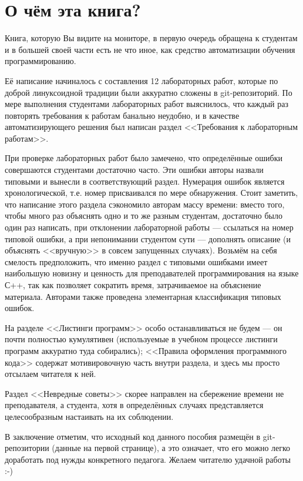 \chapter*{О чём эта книга?}

Книга, которую Вы видите на мониторе,
в первую очередь обращена к студентам и
в большей своей части есть не что иное, как средство автоматизации обучения программированию.

Её написание начиналось с составления 12 лабораторных работ,
которые по доброй линуксоидной традиции были аккуратно сложены в git-репозиторий.
По мере выполнения студентами лабораторных работ выяснилось,
что каждый раз повторять требования к работам банально неудобно,
и в качестве автоматизирующего решения был написан раздел <<Требования к лабораторным работам>>.

При проверке лабораторных работ было замечено, что определённые ошибки совершаются студентами достаточно часто.
Эти ошибки авторы назвали типовыми и вынесли в соответствующий раздел.
Нумерация ошибок является хронологической, т.е. номер присваивался по мере обнаружения.
Стоит заметить, что написание этого раздела сэкономило авторам массу времени:
вместо того, чтобы много раз объяснять одно и то же разным студентам,
достаточно было один раз написать, при отклонении лабораторной работы
--- ссылаться на номер типовой ошибки, а при непонимании студентом сути ---
дополнять описание (и объяснять <<вручную>> в совсем запущенных случаях).
Возьмём на себя смелость предположить,
что именно раздел с типовыми ошибками имеет наибольшую новизну и ценность для преподавателей программирования на языке С++,
так как позволяет сократить время, затрачиваемое на объяснение материала.
Авторами также проведена элементарная классификация типовых ошибок.

На разделе <<Листинги программ>> особо останавливаться не будем ---
он почти полностью кумулятивен (используемые в учебном процессе листинги программ аккуратно туда собирались);
<<Правила оформления программного кода>> содержат мотивировочную часть внутри раздела,
и здесь мы просто отсылаем читателя к ней.

Раздел <<Невредные советы>> скорее направлен на сбережение времени не преподавателя, а студента,
хотя в определённых случаях представляется целесообразным настаивать на их соблюдении.

В заключение отметим, что исходный код данного пособия размещён в git-репозитории (данные на первой странице),
а это означает, что его можно легко доработать под нужды конкретного педагога. Желаем читателю удачной работы :-)



